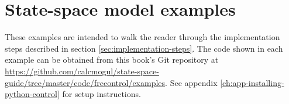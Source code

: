 
\chapter{State-space model examples}

These examples are intended to walk the reader through the implementation steps
described in section \ref{sec:implementation-steps}. The code shown in each
example can be obtained from this book's Git repository at
\url{https://github.com/calcmogul/state-space-guide/tree/master/code/frccontrol/examples}.
See appendix \ref{ch:app-installing-python-control} for setup instructions.







